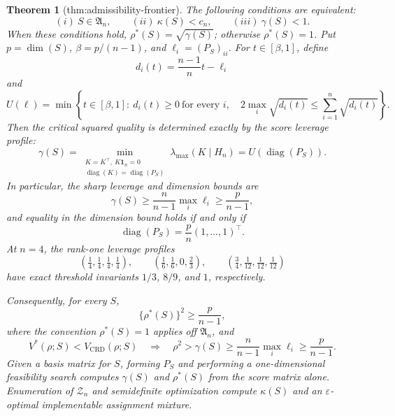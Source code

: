 \documentclass{article}
\newtheorem{theorem}{Theorem}
\begin{document}
\begin{theorem}[thm:admissibility-frontier]\label{thm:admissibility-frontier}
The following conditions are equivalent:
\[
(i)\ S\in\mathfrak A_n,
\qquad
(ii)\ \kappa(S)<c_n,
\qquad
(iii)\ \gamma(S)<1.
\]
When these conditions hold, \(\rho^*(S)=\sqrt{\gamma(S)}\); otherwise \(\rho^*(S)=1\).  Put \(p=\dim(S)\), \(\beta=p/(n-1)\), and \(\ell_i=(P_S)_{ii}\).  For \(t\in[\beta,1]\), define
\[
d_i(t)=\frac{n-1}{n}t-\ell_i
\]
and
\[
U(\ell)=\min\left\{
t\in[\beta,1]:\ d_i(t)\geq0\ \text{for every }i,\quad
2\max_i\sqrt{d_i(t)}\leq\sum_{i=1}^n\sqrt{d_i(t)}
\right\}.
\]
Then the critical squared quality is determined exactly by the score leverage profile:
\[
\gamma(S)
=\min_{\substack{K=K^\top,\ K\mathbf1_n=0\\
\operatorname{diag}(K)=\operatorname{diag}(P_S)}}
\lambda_{\max}(K\mid H_n)
=U\!\left(\operatorname{diag}(P_S)\right).
\]
In particular, the sharp leverage and dimension bounds are
\[
\gamma(S)\geq\frac{n}{n-1}\max_i\ell_i
\geq\frac{p}{n-1},
\]
and equality in the dimension bound holds if and only if
\[
\operatorname{diag}(P_S)=\frac{p}{n}(1,\ldots,1)^\top.
\]
At \(n=4\), the rank-one leverage profiles
\[
\left(\tfrac14,\tfrac14,\tfrac14,\tfrac14\right),\qquad
\left(\tfrac16,\tfrac16,0,\tfrac23\right),\qquad
\left(\tfrac34,\tfrac1{12},\tfrac1{12},\tfrac1{12}\right)
\]
have exact threshold invariants \(1/3\), \(8/9\), and \(1\), respectively.

Consequently, for every \(S\),
\[
\{\rho^*(S)\}^2\geq\frac{p}{n-1},
\]
where the convention \(\rho^*(S)=1\) applies off \(\mathfrak A_n\), and
\[
V^*(\rho;S)<V_{\mathrm{CRD}}(\rho;S)
\quad\Longrightarrow\quad
\rho^2>\gamma(S)\geq\frac{n}{n-1}\max_i\ell_i
\geq\frac{p}{n-1}.
\]
Given a basis matrix for \(S\), forming \(P_S\) and performing a one-dimensional feasibility search computes \(\gamma(S)\) and \(\rho^*(S)\) from the score matrix alone.  Enumeration of \(\mathcal Z_n\) and semidefinite optimization compute \(\kappa(S)\) and an \(\varepsilon\)-optimal implementable assignment mixture.
\end{theorem}
\end{document}

